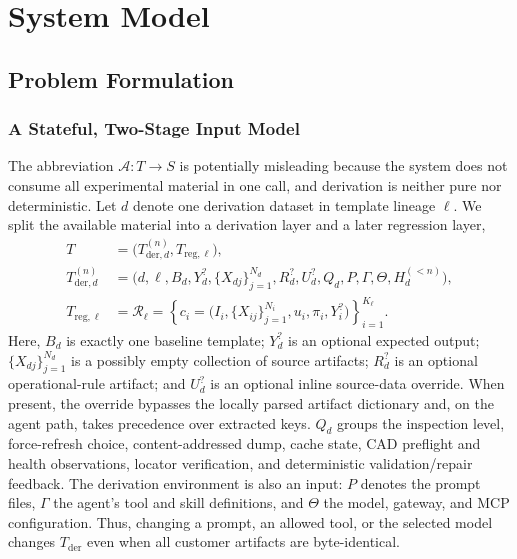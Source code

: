 \chapter{System Model}
\label{ch:architecture}

%
%

\section{Problem Formulation}
\label{sec:design:formulation}

\subsection{A Stateful, Two-Stage Input Model}
\label{sec:design:inputs}

The abbreviation $\mathcal{A}:T\rightarrow S$ is potentially misleading because the
system does not consume all experimental material in one call, and derivation is neither
pure nor deterministic. Let $d$ denote one derivation dataset in template lineage
$\ell$. We split the available material into a derivation layer and a later regression
layer,
\begin{align}
T &= \bigl(T_{\mathrm{der},d}^{(n)},T_{\mathrm{reg},\ell}\bigr), \\
T_{\mathrm{der},d}^{(n)}
  &= \bigl(d,\ell,B_d,Y_d^{?},\{X_{dj}\}_{j=1}^{N_d},R_d^{?},U_d^{?},
      Q_d,P,\Gamma,\Theta,H_d^{(<n)}\bigr), \\
T_{\mathrm{reg},\ell}
  &= \mathcal{R}_{\ell}
   = \left\{c_i=\bigl(I_i,\{X_{ij}\}_{j=1}^{N_i},u_i,\pi_i,Y_i^{?}\bigr)
     \right\}_{i=1}^{K_{\ell}} .
\end{align}
Here, $B_d$ is exactly one baseline template; $Y_d^{?}$ is an optional expected
output; $\{X_{dj}\}_{j=1}^{N_d}$ is a possibly empty collection of source artifacts;
$R_d^{?}$ is an optional operational-rule artifact; and $U_d^{?}$ is an optional
inline source-data override. When present, the override bypasses the locally parsed
artifact dictionary and, on the agent path, takes precedence over extracted keys. $Q_d$
groups the inspection level, force-refresh choice,
content-addressed dump, cache state, CAD preflight and health observations, locator
verification, and deterministic validation/repair feedback. The derivation environment
is also an input: $P$ denotes the prompt files, $\Gamma$ the agent's tool and skill
definitions, and $\Theta$ the model, gateway, and MCP configuration. Thus, changing a
prompt, an allowed tool, or the selected model changes $T_{\mathrm{der}}$ even when all
customer artifacts are byte-identical.

